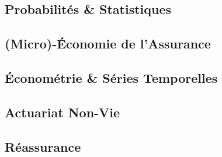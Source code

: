 \documentclass[french,a4paper]{article}
\theoremstyle{sansparenthese}
\begin{document}
\newpage
\begin{center}
    \section*{Probabilités  \& Statistiques}
    \medskip
\end{center}

\begin{multicols}{2}


\end{multicols}

\newpage


\newpage

\begin{center}
    \section*{(Micro)-Économie de l'Assurance}
    \medskip
\end{center}


\begin{multicols}{2}
	
\end{multicols}

\newpage
\begin{center}
	\section*{Économétrie \& Séries Temporelles}
	\medskip
\end{center}


\begin{multicols}{2}
	
\end{multicols}

\newpage


\begin{center}
	\section*{Actuariat Non-Vie}
	\medskip
\end{center}

\begin{multicols}{2}	
	
\end{multicols}

\newpage

\begin{center}
	\section*{Réassurance}
	\medskip
\end{center}
\end{document}
